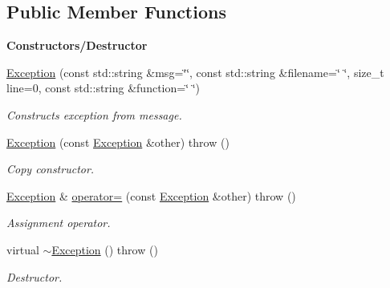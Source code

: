\subsection*{Public Member Functions}
\begin{Indent}{\bf Constructors/\+Destructor}\par
\begin{DoxyCompactItemize}
\item 
\hyperlink{classException_a3b39c4d55202aea6be3247793e46e2b0}{Exception} (const std\+::string \&msg=\char`\"{}\char`\"{}, const std\+::string \&filename=\char`\"{} \char`\"{}, size\+\_\+t line=0, const std\+::string \&function=\char`\"{} \char`\"{})\hypertarget{classException_a3b39c4d55202aea6be3247793e46e2b0}{}\label{classException_a3b39c4d55202aea6be3247793e46e2b0}

\begin{DoxyCompactList}\small\item\em Constructs exception from message. \end{DoxyCompactList}\item 
\hyperlink{classException_ae0fd52e62283ee92c085d767d0aab736}{Exception} (const \hyperlink{classException}{Exception} \&other)  throw ()\hypertarget{classException_ae0fd52e62283ee92c085d767d0aab736}{}\label{classException_ae0fd52e62283ee92c085d767d0aab736}

\begin{DoxyCompactList}\small\item\em Copy constructor. \end{DoxyCompactList}\item 
\hyperlink{classException}{Exception} \& \hyperlink{classException_a71c844ee3ac32b7656c24386e9ab60a0}{operator=} (const \hyperlink{classException}{Exception} \&other)  throw ()\hypertarget{classException_a71c844ee3ac32b7656c24386e9ab60a0}{}\label{classException_a71c844ee3ac32b7656c24386e9ab60a0}

\begin{DoxyCompactList}\small\item\em Assignment operator. \end{DoxyCompactList}\item 
virtual \hyperlink{classException_ad1ba411de295ef2eeb02ba26284a829a}{$\sim$\+Exception} ()  throw ()\hypertarget{classException_ad1ba411de295ef2eeb02ba26284a829a}{}\label{classException_ad1ba411de295ef2eeb02ba26284a829a}

\begin{DoxyCompactList}\small\item\em Destructor. \end{DoxyCompactList}\end{DoxyCompactItemize}
\end{Indent}
